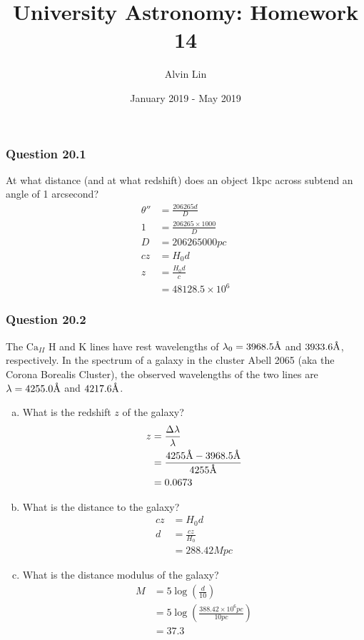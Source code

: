 \documentclass{math}
\title{University Astronomy: Homework 14}
\author{Alvin Lin}
\date{January 2019 - May 2019}
\begin{document}
\maketitle

\subsubsection*{Question 20.1}
At what distance (and at what redshift) does an object 1kpc across subtend
an angle of 1 arcsecond?
\begin{align*}
  \theta'' &= \frac{206265d}{D} \\
  1 &= \frac{206265\times1000}{D} \\
  D &= 206265000pc \\
  cz &= H_0d \\
  z &= \frac{H_0d}{c} \\
  &= 48128.5\times10^6
\end{align*}

\subsubsection*{Question 20.2}
The \( \text{Ca}_{II} \) H and K lines have rest wavelengths of \( \lambda_0 =
3968.5\textup{\AA} \) and \( 3933.6\textup{\AA} \), respectively. In the
spectrum of a galaxy in the cluster Abell 2065 (aka the Corona Borealis
Cluster), the observed wavelengths of the two lines are \( \lambda = 4255.0
\textup{\AA} \) and \( 4217.6\textup{\AA} \).
\begin{enumerate}[(a)]
  \item What is the redshift \( z \) of the galaxy?
  \begin{align*}
    z &= \frac{\Delta\lambda}{\lambda} \\
    &= \frac{4255\textup{\AA}-3968.5\textup{\AA}}{4255\textup{\AA}} \\
    &= 0.0673
  \end{align*}
  \item What is the distance to the galaxy?
  \begin{align*}
    cz &= H_0d \\
    d &= \frac{cz}{H_0} \\
    &= 288.42 Mpc
  \end{align*}
  \item What is the distance modulus of the galaxy?
  \begin{align*}
    M &= 5\log\left(\frac{d}{10}\right) \\
    &= 5\log\left(\frac{388.42\times10^6pc}{10pc}\right) \\
    &= 37.3
  \end{align*}
\end{enumerate}
\end{document}
